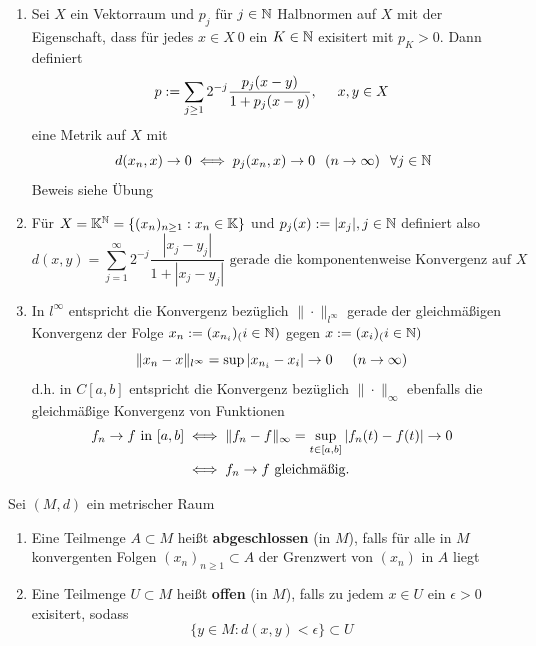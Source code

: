 \begin{beispiel}
	\begin{enumerate}[label=\alph*\upshape)]	
		\item Sei $X$ ein Vektorraum und $p_{j}$ für $j \in \mathbb{N}$ Halbnormen auf $X$ mit der Eigenschaft, dass für jedes $x \in X \ {0}$ ein $K \in \mathbb{N}$ exisitert mit $p_{K} > 0$. Dann definiert
			\[ p := \sum_{j \geq 1} 2^{-j} \frac{p_{j}(x - y)}{1 + p_{j}(x -y)}, \hspace{0.5cm} x, y \in X \]
			eine Metrik auf $X$ mit
			\[ d(x_{n}, x) \rightarrow 0 \gdw p_{j}(x_{n}, x) \rightarrow 0 \hspace{0.25cm} (n \rightarrow  \infty) \hspace{0.25cm} \forall j \in \MdN \]
			Beweis siehe Übung
		\item Für $X = \mathbb{K}^{\mathbb{N}} = \{ (x_{n})_{n \geq 1}: x_{n} \in \mathbb{K} \}$ und $p_{j}(x) := |x_{j}|, j \in \mathbb{N}$ definiert also
			\[ d(x, y) = \sum_{j = 1}^{\infty} 2^{-j} \frac{|x_{j} - y_{j}|}{1 + |x_{j} - y_{j}|} \text{ gerade die komponentenweise Konvergenz auf } X \]
		\item In $l^{\infty}$ entspricht die Konvergenz bezüglich $\| \cdot \|_{l^{\infty}}$ gerade der gleichmä{\ss}igen Konvergenz der Folge $x_{n} := (x_{n_{i}})_(i \in \mathbb{N})$ gegen $x := (x_{i})_(i \in \mathbb{N})$
			\[ \| x_{n} - x \|_{l^{\infty}} = \sup | x_{n_{i}} - x_{i} | \rightarrow 0 \hspace{0.5cm} (n \rightarrow \infty) \]
			d.h. in $C[a, b]$ entspricht die Konvergenz bezüglich $\| \cdot \|_{\infty}$ ebenfalls die gleichmä{\ss}ige Konvergenz von Funktionen
			\begin{align*}
				f_{n} \rightarrow f \text{ in } [a, b] & \iff \| f_{n} - f \|_{\infty} = \sup_{t \in [a, b]} |f_{n}(t) - f(t) | \rightarrow 0 \\
				& \iff f_{n} \rightarrow f \text{ gleichmä{\ss}ig.}
			\end{align*}
	\end{enumerate}
\end{beispiel}

\begin{definition}  
	Sei $(M, d)$ ein metrischer Raum
	\begin{enumerate}[label=\alph*\upshape)]
		\item Eine Teilmenge $A \subset M$ hei{\ss}t \textbf{abgeschlossen} (in $M$), falls für alle in $M$ konvergenten Folgen $(x_{n})_{n \geq 1} \subset A$ der Grenzwert von $(x_{n})$ in $A$ liegt
		\item Eine Teilmenge $U \subset M$ hei{\ss}t \textbf{offen} (in $M$), falls zu jedem $x \in U$ ein $\epsilon > 0$ exisitert, sodass
			\[ \{ y \in M: d(x, y) < \epsilon \} \subset U \]
	\end{enumerate}
\end{definition}

